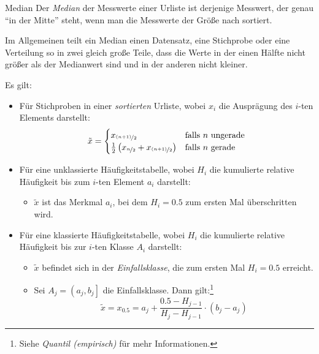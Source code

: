 \begin{bonus}{Median}
    Der \emph{Median} der Messwerte einer Urliste ist derjenige Messwert, der genau \enquote{in der Mitte} steht, wenn man die Messwerte der Größe nach sortiert.

    Im Allgemeinen teilt ein Median einen Datensatz, eine Stichprobe oder eine Verteilung so in zwei gleich große Teile, dass die Werte in der einen Hälfte nicht größer als der Medianwert sind und in der anderen nicht kleiner.

    Es gilt:
    \begin{itemize}
        \item Für Stichproben in einer \emph{sortierten} Urliste, wobei $x_i$ die Ausprägung des $i$-ten Elements darstellt:
              \[
                  \tilde{x} =
                  \begin{cases}
                      x_{\nicefrac{(n+1)}{2}}                                                  & \text{falls $n$ ungerade} \\
                      \frac{1}{2} \left( x_{\nicefrac{n}{2}} + x_{\nicefrac{(n+1)}{2}} \right) & \text{falls $n$ gerade}
                  \end{cases}
              \]
        \item Für eine unklassierte Häufigkeitstabelle, wobei $H_i$ die kumulierte relative Häufigkeit bis zum $i$-ten Element $a_i$ darstellt:
              \begin{itemize}
                  \item $\tilde{x}$ ist das Merkmal $a_i$, bei dem $H_i = 0.5$ zum ersten Mal überschritten wird.
              \end{itemize}
        \item Für eine klassierte Häufigkeitstabelle, wobei $H_i$ die kumulierte relative Häufigkeit bis zur $i$-ten Klasse $A_i$ darstellt:
              \begin{itemize}
                  \item $\tilde{x}$ befindet sich in der \emph{Einfallsklasse}, die zum ersten Mal $H_i = 0.5$ erreicht.
                  \item Sei $A_j = \left( a_j, b_j \right]$ die Einfallsklasse.
                        Dann gilt:\footnote{Siehe \emph{Quantil (empirisch)} für mehr Informationen.}
                        \[
                            \tilde{x} = x_{0.5} = a_j + \frac{0.5 - H_{j-1}}{H_{j} - H_{j-1}} \cdot (b_j - a_j)
                        \]
              \end{itemize}
    \end{itemize}
\end{bonus}

